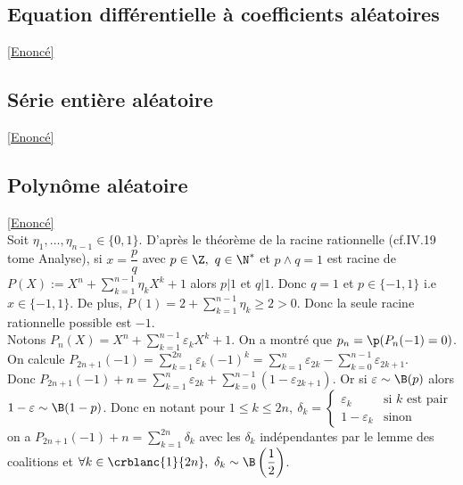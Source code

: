 \documentclass[8pt]{book}
\begin{document}
	\subsection{Equation différentielle à coefficients aléatoires}
	\label{Equation différentielle à coefficients aléatoires corrigé}
	\textcolor{blue}{\hyperref[Equation différentielle à coefficients aléatoires]{[Enoncé]}}\\
	
	\subsection{Série entière aléatoire}
	\label{Série entière aléatoire corrigé}
	\textcolor{blue}{\hyperref[Série entière aléatoire]{[Enoncé]}}\\
	
	\subsection{Polynôme aléatoire }
	\label{Polynôme aléatoire corrigé}
	\textcolor{blue}{\hyperref[Polynôme aléatoire]{[Enoncé]}}\\
	Soit $\eta_1,\dots,\eta_{n-1}\in \{0,1\}$. D'après le théorème de la racine rationnelle (cf.IV.19 tome Analyse), si $x=\dfrac{p}{q}$ avec $p\in \Z,\ q\in \N^*$ et $p\wedge q=1$ est racine de $P(X):=X^n+\displaystyle\sum_{k=1}^{n-1}\eta_kX^k+1$ alors $p|1$ et $q|1$. Donc $q=1$ et $p\in \{-1,1\}$ i.e $x\in \{-1,1\}$. De plus, $P(1)=2+\displaystyle\sum_{k=1}^{n-1}\eta_k\geq 2>0$. Donc la seule racine rationnelle possible est $-1$.\\
	Notons $P_n(X)=\displaystyle X^n+\sum_{k=1}^{n-1}\varepsilon_kX^k+1$. On a montré que $p_n=\p(P_n(-1)=0)$.\\
	On calcule $P_{2n+1}(-1)=\displaystyle\sum_{k=1}^{2n}\varepsilon_k(-1)^k=\sum_{k=1}^n\varepsilon_{2k}-\sum_{k=0}^{n-1}\varepsilon_{2k+1}$.\\
	Donc $P_{2n+1}(-1)+n=\displaystyle\sum_{k=1}^n\varepsilon_{2k}+\sum_{k=0}^{n-1}(1-\varepsilon_{2k+1})$. Or si $\varepsilon\sim\B(p)$ alors $1-\varepsilon\sim\B(1-p)$. Donc en notant pour $1\leq k\leq 2n,\ \delta_k=\begin{cases}
		\varepsilon_k&\mbox{si }k\mbox{ est pair}\\
		1-\varepsilon_k&\mbox{sinon}
	\end{cases}$ on a $P_{2n+1}(-1)+n=\displaystyle\sum_{k=1}^{2n}\delta_k$ avec les $\delta_k$ indépendantes par le lemme des coalitions et $\forall k\in \crblanc{1}{2n},\ \delta_k\sim\B\left(\dfrac{1}{2}\right)$.\\
\end{document}
